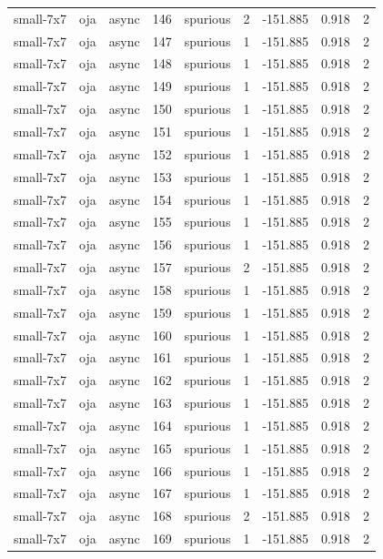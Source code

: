 \begin{tabular}{lllrlrrrr}
small-7x7 & oja & async & 146 & spurious & 2 & -151.885 & 0.918 & 2 \\
small-7x7 & oja & async & 147 & spurious & 1 & -151.885 & 0.918 & 2 \\
small-7x7 & oja & async & 148 & spurious & 1 & -151.885 & 0.918 & 2 \\
small-7x7 & oja & async & 149 & spurious & 1 & -151.885 & 0.918 & 2 \\
small-7x7 & oja & async & 150 & spurious & 1 & -151.885 & 0.918 & 2 \\
small-7x7 & oja & async & 151 & spurious & 1 & -151.885 & 0.918 & 2 \\
small-7x7 & oja & async & 152 & spurious & 1 & -151.885 & 0.918 & 2 \\
small-7x7 & oja & async & 153 & spurious & 1 & -151.885 & 0.918 & 2 \\
small-7x7 & oja & async & 154 & spurious & 1 & -151.885 & 0.918 & 2 \\
small-7x7 & oja & async & 155 & spurious & 1 & -151.885 & 0.918 & 2 \\
small-7x7 & oja & async & 156 & spurious & 1 & -151.885 & 0.918 & 2 \\
small-7x7 & oja & async & 157 & spurious & 2 & -151.885 & 0.918 & 2 \\
small-7x7 & oja & async & 158 & spurious & 1 & -151.885 & 0.918 & 2 \\
small-7x7 & oja & async & 159 & spurious & 1 & -151.885 & 0.918 & 2 \\
small-7x7 & oja & async & 160 & spurious & 1 & -151.885 & 0.918 & 2 \\
small-7x7 & oja & async & 161 & spurious & 1 & -151.885 & 0.918 & 2 \\
small-7x7 & oja & async & 162 & spurious & 1 & -151.885 & 0.918 & 2 \\
small-7x7 & oja & async & 163 & spurious & 1 & -151.885 & 0.918 & 2 \\
small-7x7 & oja & async & 164 & spurious & 1 & -151.885 & 0.918 & 2 \\
small-7x7 & oja & async & 165 & spurious & 1 & -151.885 & 0.918 & 2 \\
small-7x7 & oja & async & 166 & spurious & 1 & -151.885 & 0.918 & 2 \\
small-7x7 & oja & async & 167 & spurious & 1 & -151.885 & 0.918 & 2 \\
small-7x7 & oja & async & 168 & spurious & 2 & -151.885 & 0.918 & 2 \\
small-7x7 & oja & async & 169 & spurious & 1 & -151.885 & 0.918 & 2 \\

\end{tabular}
